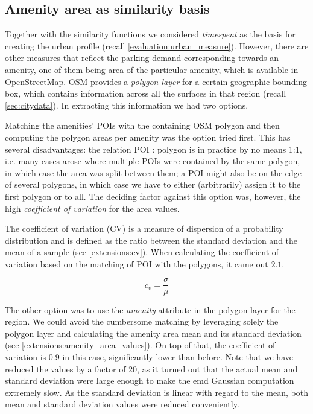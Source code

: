 {\subsection{Amenity area as similarity basis}
\label{extensions:amenity_area}
Together with the similarity functions we considered \textit{timespent} as the basis for creating the urban profile (recall \autoref{evaluation:urban_measure}). However, there are other measures that reflect the parking demand corresponding towards an amenity, one of them being area of the particular amenity, which is available in OpenStreetMap. OSM provides a \textit{polygon layer} for a certain geographic bounding box, which contains information across all the surfaces in that region (recall \autoref{sec:citydata}). In extracting this information we had two options. 

Matching the amenities' POIs with the containing OSM polygon and then computing the polygon areas per amenity was the option tried first. This has several disadvantages: the relation POI : polygon is in practice by no means 1:1, i.e. many cases arose where multiple POIs were contained by the same polygon, in which case the area was split between them; a POI might also be on the edge of several polygons, in which case we have to either (arbitrarily) assign it to the first polygon or to all. The deciding factor against this option was, however, the high \textit{coefficient of variation} for the area values. 

The coefficient of variation (CV) is a measure of dispersion of a probability distribution and is defined as the ratio between the standard deviation and the mean of a sample (see \autoref{extensions:cv}). When calculating the coefficient of variation based on the matching of POI with the polygons, it came out $2.1$.

\begin{equation}
c_v = \frac{\sigma}{\mu} 
\label{extensions:cv}
\end{equation}

The other option was to use the \textit{amenity} attribute in the polygon layer for the region. We could avoid the cumbersome matching by leveraging solely the polygon layer and calculating the amenity area mean and its standard deviation (see \autoref{extensions:amenity_area_values}). On top of that, the coefficient of variation is $0.9$ in this case, significantly lower than before. Note that we have reduced the values by a factor of 20, as it turned out that the actual mean and standard deviation were large enough to make the emd Gaussian computation extremely slow. As the standard deviation is linear with regard to the mean, both mean and standard deviation values were reduced conveniently. 

}
